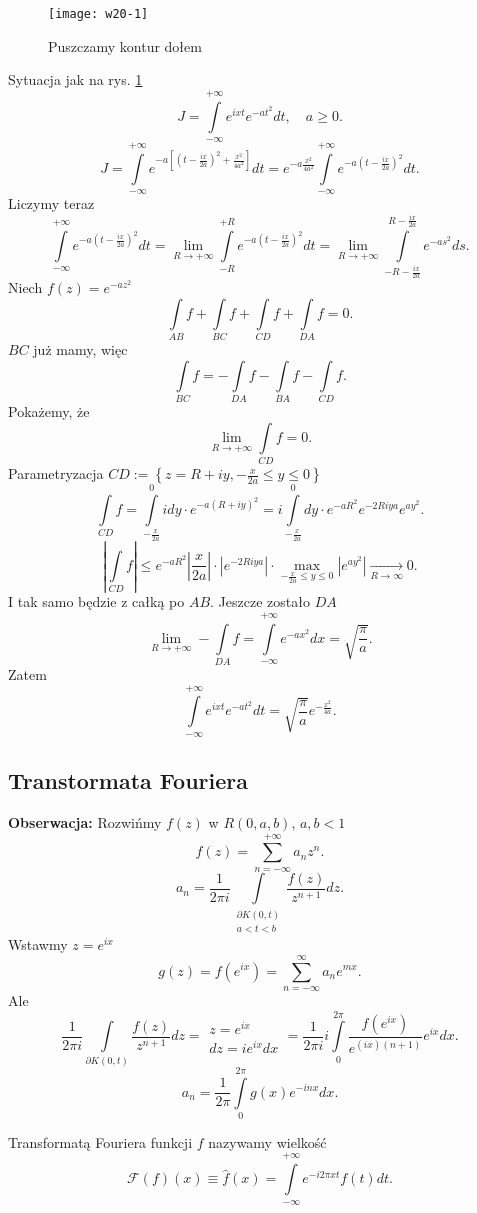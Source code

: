 \documentclass[../main.tex]{subfiles}
\begin{document}
\begin{figure}[h]
    \centering
    \texttt{[image: w20-1]}
    \caption{Puszczamy kontur dołem}
    \label{fig:w20-1}
\end{figure}
\begin{przyklad}
    Sytuacja jak na rys. \ref{fig:w20-1}
    \[
    J = \int\limits_{-\infty}^{+\infty}e^{ixt}e^{-at^2}dt,\quad a \ge 0
    .\]
\[
    J = \int\limits_{-\infty}^{+\infty}e^{-a\left[ (t - \frac{ix}{2a})^2 + \frac{x^2}{4a^2}\right]}dt = e^{-a\frac{x^2}{4a^2}}\int\limits_{-\infty}^{+\infty}e^{-a(t - \frac{ix}{2a})^2}dt
.\]
Liczymy teraz
\[
    \int\limits_{-\infty}^{+\infty}e^{-a\left( t - \frac{ix}{2a} \right)^2 }dt = \lim\limits_{R\to +\infty}\int\limits_{-R}^{+R}e^{-a\left( t - \frac{ix}{2a} \right) ^2}dt = \lim_{R \to +\infty} \int\limits_{-R - \frac{ix}{2a}}^{R - \frac{ix}{2a}}e^{-as^2}ds
.\]
Niech $f(z) = e^{-az^2}$
 \[
 \int\limits_{AB}f + \int\limits_{BC}f + \int\limits_{CD}f + \int\limits_{DA}f = 0
 .\]
 $BC$ już mamy, więc
    \[
    \int\limits_{BC}f = -\int\limits_{DA}f - \int\limits_{BA}f - \int\limits_{CD}f
    .\]
Pokażemy, że
\[
\lim_{R \to +\infty}\int\limits_{CD}f = 0
.\]
Parametryzacja $CD := \left\{ z = R + iy, -\frac{x}{2a}\le y \le 0 \right\} $
\[
    \int\limits_{CD}f = \int\limits_{-\frac{x}{2a}}^{0}idy\cdot  e^{-a\left( R+iy \right) ^2} = i\int\limits_{-\frac{x}{2a}}^{0}dy\cdot e^{-aR^2}e^{-2Riya}e^{ay^2}
.\]
\[
\left| \int\limits_{CD}f \right| \le e^{-aR^2} \left| \frac{x}{2a} \right| \cdot \left| e^{-2Riya} \right| \cdot \underset{-\frac{x}{2a}\le y \le 0}{\max}  \left| e^{ay^2} \right| \underset{R\to \infty}{\longrightarrow} 0
.\]
I tak samo będzie z całką po $AB$. Jeszcze zostało $DA$
\[
\lim_{R \to +\infty}-\int\limits_{DA}f = \int\limits_{-\infty}^{+\infty}e^{-ax^2}dx = \sqrt{\frac{\pi}{a}}
.\]
Zatem
\[
\int\limits_{-\infty}^{+\infty}e^{ixt}e^{-at^2}dt = \sqrt{\frac{\pi}{a}} e^{-\frac{x^2}{4a}}
.\]
\end{przyklad}
\subsection{Transtormata Fouriera}
\textbf{Obserwacja:} Rozwińmy $f(z)$ w $R(0,a,b)$, $a,b < 1$
\[
    f(z) = \sum_{n=-\infty}^{+\infty} a_nz^n
.\]
\[
    a_n = \frac{1}{2\pi i}\int\limits_{\substack{\partial K(0,t)\\ a < t < b}}\frac{f(z)}{z^{n+1}}dz
.\]
Wstawmy $z = e^{ix}$
 \[
     g(z) = f\left(e^{ix}\right) = \sum_{n=-\infty}^{\infty} a_n e^{mx}
 .\]
 Ale
 \[
     \frac{1}{2\pi i} \int\limits_{\partial K(0,t)}\frac{f(z)}{z^{n+1}}dz = \begin{matrix} z = e^{ix}\\ dz = ie^{ix}dx\end{matrix} = \frac{1}{2\pi i}i \int\limits_{0}^{2\pi} \frac{f\left( e^{ix} \right) }{e^{(ix)(n+1)}}e^{ix}dx
 .\]
 \[
     a_n = \frac{1}{2\pi}\int\limits_{0}^{2\pi}g(x)e^{-inx}dx
 .\]
 \begin{definicja}
     Transformatą Fouriera funkcji $f$ nazywamy wielkość
     \[
         \mathcal{F}(f)(x) \equiv \hat{f}(x) = \int\limits_{-\infty}^{+\infty} e^{-i2\pi xt}f(t)dt
     .\]
 \end{definicja}
\end{document}
